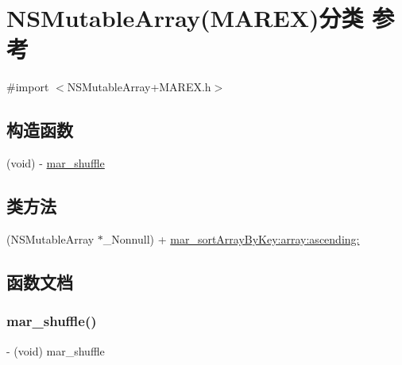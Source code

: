 \hypertarget{category_n_s_mutable_array_07_m_a_r_e_x_08}{}\section{N\+S\+Mutable\+Array(M\+A\+R\+EX)分类 参考}
\label{category_n_s_mutable_array_07_m_a_r_e_x_08}


{\ttfamily \#import $<$N\+S\+Mutable\+Array+\+M\+A\+R\+E\+X.\+h$>$}

\subsection*{构造函数}
\begin{DoxyCompactItemize}
\item 
(void) -\/ \hyperlink{category_n_s_mutable_array_07_m_a_r_e_x_08_a41bdc62ca3bebe48de38f4606f89161d}{mar\+\_\+shuffle}
\end{DoxyCompactItemize}
\subsection*{类方法}
\begin{DoxyCompactItemize}
\item 
(N\+S\+Mutable\+Array $\ast$\+\_\+\+Nonnull) + \hyperlink{category_n_s_mutable_array_07_m_a_r_e_x_08_a00e7a9dc0ff73422f6e98f880639ed6a}{mar\+\_\+sort\+Array\+By\+Key\+:array\+:ascending\+:}
\end{DoxyCompactItemize}


\subsection{函数文档}
\mbox{\label{category_n_s_mutable_array_07_m_a_r_e_x_08_a41bdc62ca3bebe48de38f4606f89161d}} 
\subsubsection{\texorpdfstring{mar\+\_\+shuffle()}{mar\_shuffle()}}
{\footnotesize\ttfamily -\/ (void) mar\+\_\+shuffle \begin{DoxyParamCaption}{ }\end{DoxyParamCaption}}

